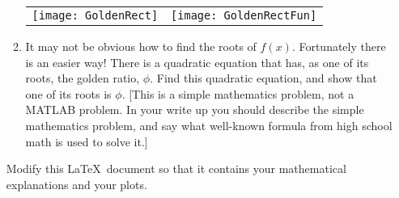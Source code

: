 \documentclass[12pt]{article}
\begin{document}
\begin{enumerate}
\begin{enumerate}
\begin{center}
\begin{tabular}{cc}
\texttt{[image: GoldenRect]} &
\texttt{[image: GoldenRectFun]}
\end{tabular}
\end{center}

\item
It may not be obvious how to find the roots of $f(x)$.  Fortunately
there is an easier way!  There
is a quadratic equation that has, as one of its roots, the
golden ratio, $\phi$.  Find this quadratic equation, and 
show that one of its roots is $\phi$. [This is a simple mathematics problem, not a MATLAB problem. In your write up you should describe the simple mathematics problem, and say what well-known formula from high school math is used to solve it.]
\end{enumerate}
Modify this \LaTeX\ document so that it contains your mathematical explanations and your plots.

\end{enumerate}
\end{document}
